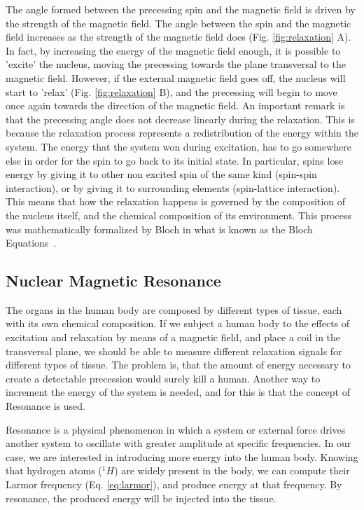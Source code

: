 The angle formed between the precessing spin and the magnetic field is driven
by the strength of the magnetic field. The angle between the spin and the magnetic
field increases as the strength of the magnetic field does (Fig. \ref{fig:relaxation} A).
In fact, by increasing the energy of the magnetic field enough, it is possible
to 'excite' the nucleus, moving the precessing towards the plane transversal to
the magnetic field. However, if the external magnetic field
goes off, the nucleus will start to 'relax' (Fig. \ref{fig:relaxation} B), and
the precessing will begin to move once again towards the direction of the
magnetic field. An important remark is that the precessing angle does not
decrease linearly during the relaxation. This is because the relaxation
process represents a redistribution of the energy within the system. The energy that
the system won during excitation, has to go somewhere else in order for the
spin to go back to its initial state. In particular, spins lose energy by 
giving it to other non excited spin of the same kind (spin-spin interaction),
or by giving it to surrounding elements (spin-lattice interaction). This means
that how the relaxation happens is governed by the composition of the nucleus
itself, and the chemical composition of its environment. This process was
mathematically formalized by Bloch in what is known as the Bloch
Equations~\cite{Bloch1946}.

\subsection{Nuclear Magnetic Resonance}
The organs in the human body are composed by different types of tissue, each
with its own chemical composition. If we subject a human body to the effects
of excitation and relaxation by means of a magnetic field, and place a coil
in the transversal plane, we should be able to measure different relaxation
signals for different types of tissue. The problem is, that the amount of 
energy necessary to create a detectable precession would surely kill a human.
Another way to increment the energy of the system is needed, and for this is 
that the concept of Resonance is used.

Resonance is a physical phenomenon in which a system or external force drives
another system to oscillate with greater amplitude at specific frequencies.
In our case, we are interested in introducing more energy into the human body.
Knowing that hydrogen atoms ($^1 H$) are widely present in the body, we can
compute their Larmor frequency (Eq. \ref{eq:larmor}), and produce energy at
that frequency. By resonance, the produced energy will be injected into the
tissue.


